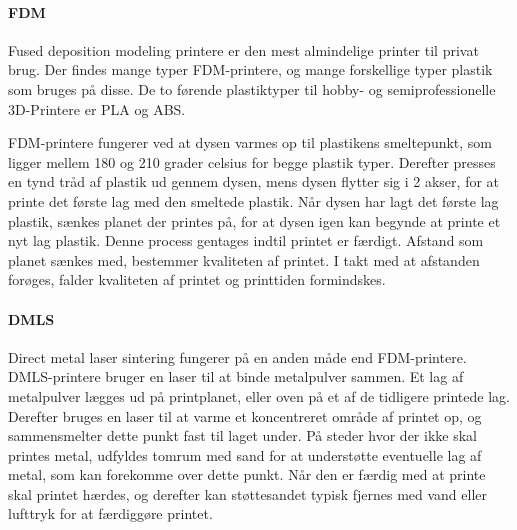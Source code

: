 \paragraph{FDM} %


Fused deposition modeling printere er den mest almindelige printer til privat brug. Der findes mange typer FDM-printere, og mange forskellige typer plastik som bruges på disse. De to førende plastiktyper til hobby- og semiprofessionelle 3D-Printere er PLA og ABS.\autocite{_3d-guide:_????} 

FDM-printere fungerer ved at dysen varmes op til plastikens smeltepunkt, som ligger mellem 180 og 210 grader celsius for begge plastik typer. Derefter presses en tynd tråd af plastik ud gennem dysen, mens dysen flytter sig i 2 akser, for at printe det første lag med den smeltede plastik. 
Når dysen har lagt det første lag plastik, sænkes planet der printes på, for at dysen igen kan begynde at printe et nyt lag plastik. Denne process gentages indtil printet er færdigt. 
Afstand som planet sænkes med, bestemmer kvaliteten af printet. I takt med at afstanden forøges, falder kvaliteten af printet og printtiden formindskes.


\paragraph{DMLS} %


Direct metal laser sintering fungerer på en anden måde end FDM-printere. DMLS-printere bruger en laser til at binde metalpulver sammen. Et lag af metalpulver lægges ud på printplanet, eller oven på et af de tidligere printede lag. Derefter bruges en laser til at varme et koncentreret område af printet op, og sammensmelter dette punkt fast til laget under. På steder hvor der ikke skal printes metal, udfyldes tomrum med sand for at understøtte eventuelle lag af metal, som kan forekomme over dette punkt.\autocite{manyika_disruptive_2013}
Når den er færdig med at printe skal printet hærdes, og derefter kan støttesandet typisk fjernes med vand eller lufttryk for at færdiggøre printet\autocite{manyika_disruptive_2013}.
\newpage



